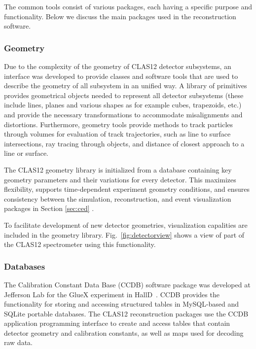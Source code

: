 The common tools consist of various packages, each having a specific purpose and functionality. Below we discuss
the main packages used in the reconstruction software.

\subsubsection{Geometry}

Due to the complexity of the geometry of CLAS12 detector subsystems, an interface was developed to provide classes and software tools that are used to describe the geometry of all subsystem in an unified way.  A library of primitives provides geometrical objects needed to represent all detector subsystems (these include lines, planes and various shapes as for example cubes, trapezoids, etc.) and provide the necessary transformations to accommodate misalignments and distortions.  Furthermore, geometry tools provide methods to track particles through volumes for evaluation of track trajectories, such as line to surface intersections, ray tracing through objects, and distance of closest approach to a line or surface.

The CLAS12 geometry library is initialized from a database containing key geometry parameters and their variations for every detector.  This maximizes flexibility, supports time-dependent experiment geometry conditions, and ensures consistency between the simulation, reconstruction, and event visualization packages in Section \ref{sec:ced} \cite{sim-nim}. 

To facilitate development of new detector geometries, visualization capalities are included in the geometry library. Fig.~\ref{fig:detectorview} shows a view of part of the CLAS12 spectrometer using this functionality.


\subsubsection{Databases}

The Calibration Constant Data Base (CCDB) software package was developed at Jefferson Lab for the GlueX experiment
in HallD~\cite{gluex}.  CCDB provides the functionality for storing and accessing structured tables in MySQL-based and SQLite portable databases.
The CLAS12 reconstruction packages use the CCDB application programming interface to create and access
tables that contain detector geometry and calibration constants, as well as maps used for decoding raw data.

